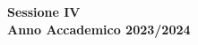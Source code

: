 \begin{titlepage}

    \vspace{1cm}

    \begin{center}
        {\large{\textbf{Sessione IV\\Anno Accademico 2023/2024}}}
    \end{center}
\end{titlepage}
